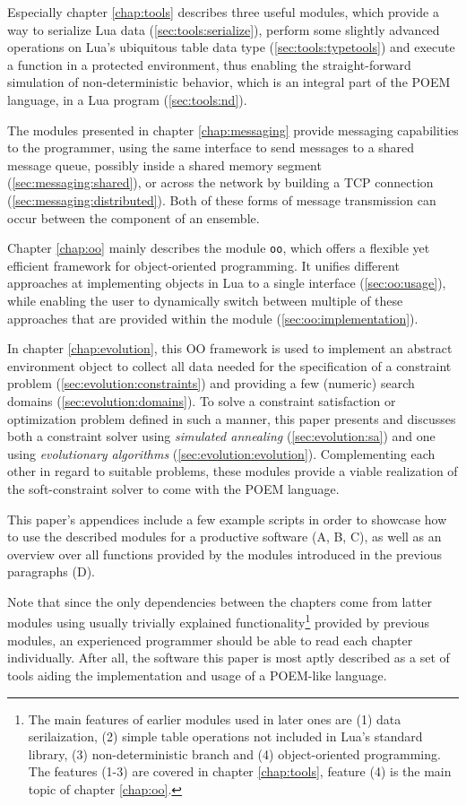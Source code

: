 Especially chapter \ref{chap:tools} describes three useful modules, which provide a way to serialize Lua data (\ref{sec:tools:serialize}), perform some slightly advanced operations on Lua's ubiquitous table data type (\ref{sec:tools:typetools}) and execute a function in a protected environment, thus enabling the straight-forward simulation of non-deterministic behavior, which is an integral part of the POEM language, in a Lua program (\ref{sec:tools:nd}).

The modules presented in chapter \ref{chap:messaging} provide messaging capabilities to the programmer, using the same interface to send messages to a shared message queue, possibly inside a shared memory segment (\ref{sec:messaging:shared}), or across the network by building a TCP connection (\ref{sec:messaging:distributed}). Both of these forms of message transmission can occur between the component of an ensemble.

Chapter \ref{chap:oo} mainly describes the module \texttt{oo}, which offers a flexible yet efficient framework for object-oriented programming. It unifies different approaches at implementing objects in Lua to a single interface (\ref{sec:oo:usage}), while enabling the user to dynamically switch between multiple of these approaches that are provided within the module (\ref{sec:oo:implementation}).

In chapter \ref{chap:evolution}, this OO framework is used to implement an abstract environment object to collect all data needed for the specification of a constraint problem (\ref{sec:evolution:constraints}) and providing a few (numeric) search domains (\ref{sec:evolution:domains}). To solve a constraint satisfaction or optimization problem defined in such a manner, this paper presents and discusses both a constraint solver using \emph{simulated annealing} (\ref{sec:evolution:sa}) and one using \emph{evolutionary algorithms} (\ref{sec:evolution:evolution}). Complementing each other in regard to suitable problems, these modules provide a viable realization of the soft-constraint solver to come with the POEM language.

This paper's appendices include a few example scripts in order to showcase how to use the described modules for a productive software (A, B, C), as well as an overview over all functions provided by the modules introduced in the previous paragraphs (D).

Note that since the only dependencies between the chapters come from latter modules using usually trivially explained functionality\footnote{The main features of earlier modules used in later ones are (1) data serilaization, (2) simple table operations not included in Lua's standard library, (3) non-deterministic branch and (4) object-oriented programming. The features (1-3) are covered in chapter \ref{chap:tools}, feature (4) is the main topic of chapter \ref{chap:oo}.} provided by previous modules, an experienced programmer should be able to read each chapter individually. After all, the software this paper is most aptly described as a set of tools aiding the implementation and usage of a POEM-like language.

\thispagestyle{plain}








